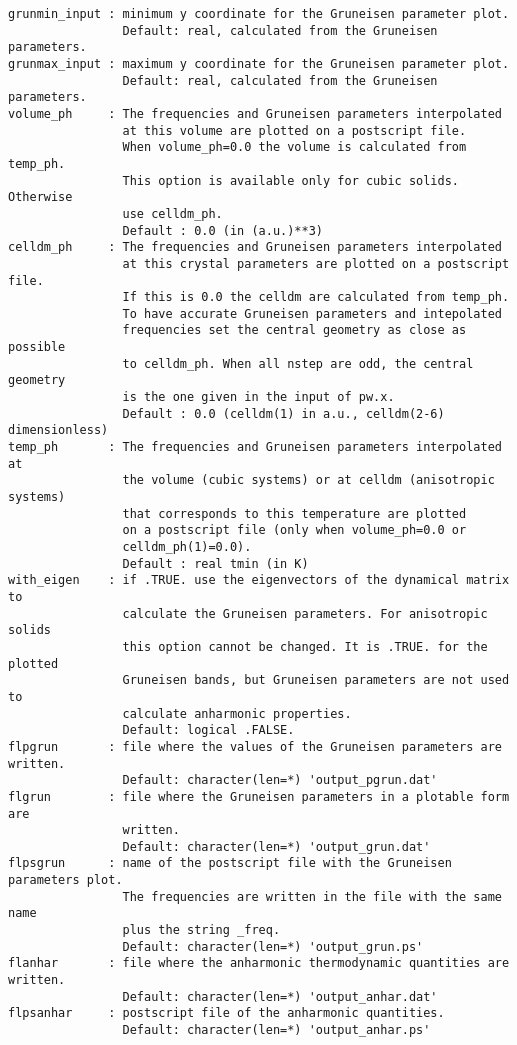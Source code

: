 \documentclass[12pt,a4paper]{article}
\begin{document}
\begin{verbatim}
grunmin_input : minimum y coordinate for the Gruneisen parameter plot.
                Default: real, calculated from the Gruneisen parameters.
grunmax_input : maximum y coordinate for the Gruneisen parameter plot.
                Default: real, calculated from the Gruneisen parameters.
volume_ph     : The frequencies and Gruneisen parameters interpolated 
                at this volume are plotted on a postscript file. 
                When volume_ph=0.0 the volume is calculated from temp_ph.
                This option is available only for cubic solids. Otherwise
                use celldm_ph.
                Default : 0.0 (in (a.u.)**3)
celldm_ph     : The frequencies and Gruneisen parameters interpolated 
                at this crystal parameters are plotted on a postscript file. 
                If this is 0.0 the celldm are calculated from temp_ph.
                To have accurate Gruneisen parameters and intepolated
                frequencies set the central geometry as close as possible 
                to celldm_ph. When all nstep are odd, the central geometry 
                is the one given in the input of pw.x.
                Default : 0.0 (celldm(1) in a.u., celldm(2-6) dimensionless)
temp_ph       : The frequencies and Gruneisen parameters interpolated at 
                the volume (cubic systems) or at celldm (anisotropic systems)
                that corresponds to this temperature are plotted 
                on a postscript file (only when volume_ph=0.0 or 
                celldm_ph(1)=0.0).
                Default : real tmin (in K)
with_eigen    : if .TRUE. use the eigenvectors of the dynamical matrix to
                calculate the Gruneisen parameters. For anisotropic solids
                this option cannot be changed. It is .TRUE. for the plotted
                Gruneisen bands, but Gruneisen parameters are not used to
                calculate anharmonic properties.
                Default: logical .FALSE. 
flpgrun       : file where the values of the Gruneisen parameters are written. 
                Default: character(len=*) 'output_pgrun.dat'
flgrun        : file where the Gruneisen parameters in a plotable form are
                written.
                Default: character(len=*) 'output_grun.dat'
flpsgrun      : name of the postscript file with the Gruneisen parameters plot.
                The frequencies are written in the file with the same name 
                plus the string _freq.
                Default: character(len=*) 'output_grun.ps'
flanhar       : file where the anharmonic thermodynamic quantities are written.
                Default: character(len=*) 'output_anhar.dat'
flpsanhar     : postscript file of the anharmonic quantities.
                Default: character(len=*) 'output_anhar.ps'
\end{verbatim}
\end{document}
